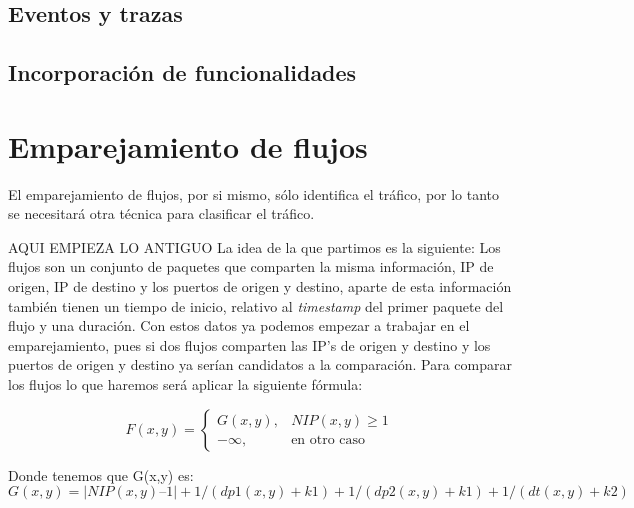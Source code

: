 \subsection{Eventos y trazas}

\subsection{Incorporación de funcionalidades}

\section{Emparejamiento de flujos}

El emparejamiento de flujos, por si mismo, sólo identifica el tráfico, por lo tanto se necesitará otra técnica 
para clasificar el tráfico.



AQUI EMPIEZA LO ANTIGUO
\intro
La idea de la que partimos es la siguiente: 
Los flujos son un conjunto de paquetes que comparten la misma 
información, IP de origen, IP de destino y los puertos de origen 
y destino, aparte de esta información también tienen un tiempo de 
inicio, relativo al \textit{timestamp} del primer paquete del flujo y una 
duración. Con estos datos ya podemos empezar a trabajar en el 
emparejamiento, pues si dos flujos comparten las IP’s de origen y 
destino y los puertos de origen y destino ya serían candidatos a 
la comparación. 
\intro
Para comparar los flujos lo que haremos será aplicar la siguiente 
fórmula:
\intro

\begin{equation*}
	F(x,y)=
 	\begin{cases}
	  G(x,y), & NIP(x,y) \geq 1 \\
	  -\infty, & \text{en otro caso}
	 \end{cases}
\end{equation*}

\noindent Donde tenemos que G(x,y) es:
\intro
\begin{displaymath}
G(x,y) = |NIP(x,y) – 1| + 1 / (dp1(x,y) + k1) + 1 / (dp2(x,y) + k1) + 1 / (dt(x,y) + k2)
\end{displaymath}

